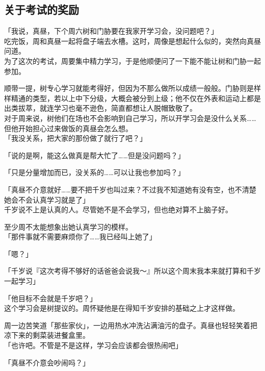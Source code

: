﻿\subsection{关于考试的奖励}

「我说，真昼，下个周六树和门胁要在我家开学习会，没问题吧？」\\

吃完饭，周和真昼一起将盘子端去水槽。这时，周像是想起什么似的，突然向真昼问道。\\

为了这次的考试，周要集中精力学习，于是他顺便问了一下能不能让树和门胁一起参加。

顺带一提，树专心学习就能考得好，但因为不那么做所以成绩一般般。门胁则是样样精通的类型，若以上中下分级，大概会被分到上级；他不仅在外表和运动上都是出类拔萃，就连学习也毫不逊色，简直都想让人脱帽致敬了。\\

对于周来说，树他们在场也不会影响到自己学习，所以开学习会是没什么关系……但他开始担心过来做饭的真昼会怎么想。\\

「我没关系，把大家的那份做了就行了吧？」

「说的是啊，能这么做真是帮大忙了……但是没问题吗？」

「只是分量增加而已，没关系的……可以让我也参加吗？」

「真昼不介意就好……要不把千岁也叫过来？不过我不知道她有没有空，也不清楚她会不会认真学习就是了」\\

千岁说不上是认真的人。尽管她不是不会学习，但也绝对算不上脑子好。

至少周不太能想象出她认真学习的模样。\\

「那件事就不需要麻烦你了……我已经叫上她了」

「嗯？」

「千岁说『这次考得不够好的话爸爸会说我～』所以这个周末我本来就打算和千岁一起学习」

「他目标不会就是千岁吧？」\\

这个学习会是树提议的。周怀疑他是在得知千岁安排的基础之上才这样做。

周一边苦笑道「那些家伙」，一边用热水冲洗沾满油污的盘子。真昼也轻轻笑着把凉下来的剩菜装进餐盒里。\\

「也许吧。不管是不是这样，学习会应该都会很热闹吧」

「真昼不介意会吵闹吗？」

